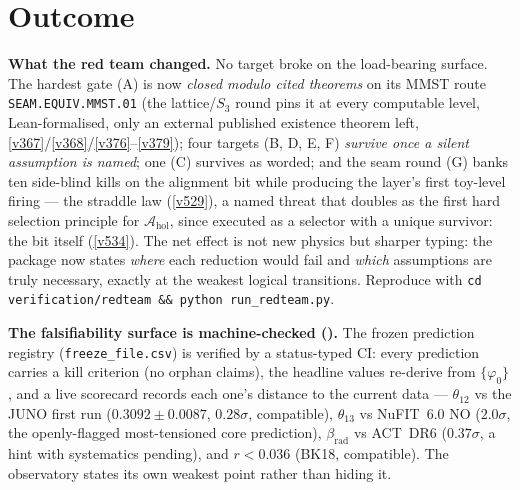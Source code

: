 \documentclass[11pt,a4paper]{article}
\begin{document}
\section*{Outcome}
\par\smallskip\noindent\textbf{What the red team changed.}
No target broke on the load-bearing surface. The hardest gate (A) is now \emph{closed modulo cited theorems} on its MMST route \texttt{SEAM.EQUIV.MMST.01} (the lattice/$S_3$ round pins it
at every computable level, Lean-formalised, only an external published existence theorem left,
\vref{v367}/\vref{v368}/\vref{v376}--\vref{v379});
four targets (B, D, E, F) \emph{survive once a silent assumption is named}; one (C) survives as
worded; and the seam round (G) banks ten side-blind kills on the alignment bit while producing
the layer's first toy-level firing --- the straddle law (\vref{v529}), a named threat that doubles
as the first hard selection principle for $\mathcal A_{\mathrm{hol}}$, since executed as a selector
with a unique survivor: the bit itself (\vref{v534}). The net effect is not new
physics but sharper typing: the package now states \emph{where}
each reduction would fail and \emph{which} assumptions are truly necessary, exactly at the weakest
logical transitions. Reproduce with \texttt{cd verification/redteam \&\& python run\_redteam.py}.

\par\smallskip\noindent\textbf{The falsifiability surface is machine-checked ().}
The frozen prediction registry (\texttt{freeze\_file.csv}) is verified by a status-typed CI: every prediction
carries a kill criterion (no orphan claims), the headline values re-derive from $\{\varphi_0\}$, and a live scorecard
records each one's distance to the current data --- $\theta_{12}$ vs the JUNO first run ($0.3092{\pm}0.0087$,
$0.28\sigma$, compatible), $\theta_{13}$ vs NuFIT~6.0 NO ($2.0\sigma$, the openly-flagged most-tensioned core
prediction), $\beta_{\mathrm{rad}}$ vs ACT~DR6 ($0.37\sigma$, a hint with systematics pending), and $r<0.036$
(BK18, compatible). The observatory states its own weakest point rather than hiding it.
\end{document}
